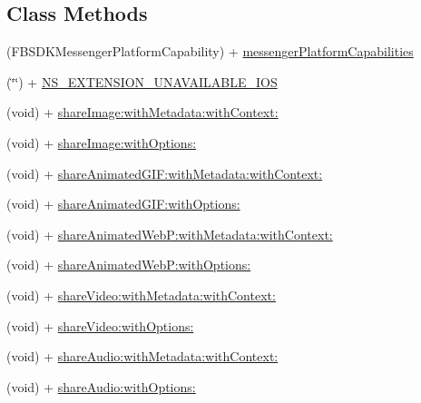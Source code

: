 \subsection*{Class Methods}
\begin{DoxyCompactItemize}
\item 
(F\-B\-S\-D\-K\-Messenger\-Platform\-Capability) + \hyperlink{interface_f_b_s_d_k_messenger_sharer_a5dd60b0a6217efb79912aff0cd628c55}{messenger\-Platform\-Capabilities}
\item 
(\char`\"{}\char`\"{}) + \hyperlink{interface_f_b_s_d_k_messenger_sharer_a65bc2a84f15bfa1cd2454410764ee3f3}{N\-S\-\_\-\-E\-X\-T\-E\-N\-S\-I\-O\-N\-\_\-\-U\-N\-A\-V\-A\-I\-L\-A\-B\-L\-E\-\_\-\-I\-O\-S}
\item 
(void) + \hyperlink{interface_f_b_s_d_k_messenger_sharer_a4af5604db5ffdf36755029085179cf3c}{share\-Image\-:with\-Metadata\-:with\-Context\-:}
\item 
(void) + \hyperlink{interface_f_b_s_d_k_messenger_sharer_a2e2f04f955cd3613017a49db70b5f3fc}{share\-Image\-:with\-Options\-:}
\item 
(void) + \hyperlink{interface_f_b_s_d_k_messenger_sharer_ae399428b96501fe5101442a23b2087cd}{share\-Animated\-G\-I\-F\-:with\-Metadata\-:with\-Context\-:}
\item 
(void) + \hyperlink{interface_f_b_s_d_k_messenger_sharer_ac2cc59f11486a868f2bb8d3d77f0f2d4}{share\-Animated\-G\-I\-F\-:with\-Options\-:}
\item 
(void) + \hyperlink{interface_f_b_s_d_k_messenger_sharer_a1af988a75931b6a9a9af919ba950c435}{share\-Animated\-Web\-P\-:with\-Metadata\-:with\-Context\-:}
\item 
(void) + \hyperlink{interface_f_b_s_d_k_messenger_sharer_af6e0d6c7054627f4da231ca60c4b43e5}{share\-Animated\-Web\-P\-:with\-Options\-:}
\item 
(void) + \hyperlink{interface_f_b_s_d_k_messenger_sharer_ab55e08f8701ece3d8ddae583d766b55a}{share\-Video\-:with\-Metadata\-:with\-Context\-:}
\item 
(void) + \hyperlink{interface_f_b_s_d_k_messenger_sharer_a1c41be0018fc133324f090330bcd3902}{share\-Video\-:with\-Options\-:}
\item 
(void) + \hyperlink{interface_f_b_s_d_k_messenger_sharer_a9621fb12d18851f45107b71151437715}{share\-Audio\-:with\-Metadata\-:with\-Context\-:}
\item 
(void) + \hyperlink{interface_f_b_s_d_k_messenger_sharer_ab0e0b7f8211e384ea0f67baa189a94ea}{share\-Audio\-:with\-Options\-:}
\end{DoxyCompactItemize}


